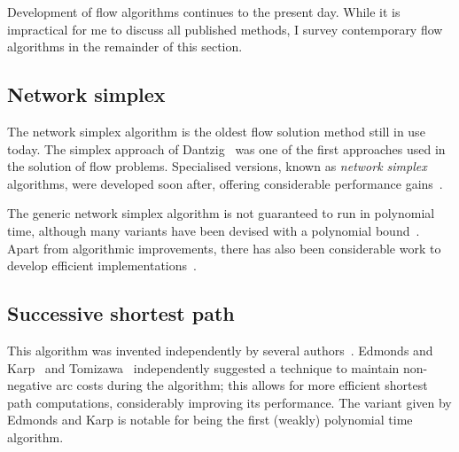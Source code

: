 
Development of flow algorithms continues to the present day. While it is impractical for me to discuss all published methods, I survey contemporary flow algorithms in the remainder of this section.

\subsection{Network simplex}

The network simplex algorithm is the oldest flow solution method still in use today. The simplex approach of Dantzig~\cite{Dantzig:1949} was one of the first approaches used in the solution of flow problems. Specialised versions, known as \emph{network simplex} algorithms, were developed soon after, offering considerable performance gains~\cite{Dantzig:1962}.

The generic network simplex algorithm is not guaranteed to run in polynomial time\footnotemark, although many variants have been devised with a polynomial bound~\cite{Tarjan:1991,Goldfarb:1992}. Apart from algorithmic improvements, there has also been considerable work to develop efficient implementations~\cite{Lobel:1996,Grigoriadis:1986}.

\subsection{Successive shortest path} \label{sec:intro-related-work-ssp}

This algorithm was invented independently by several authors~\cite{Jewell:1958,Iri:1960,BusackerGowen:1960}. Edmonds and Karp~\cite{Edmonds:1972} and Tomizawa~\cite{Tomizawa:1971} independently suggested a technique to maintain non-negative arc costs during the algorithm; this allows for more efficient shortest path computations, considerably improving its performance. The variant given by Edmonds and Karp is notable for being the first (weakly) polynomial time algorithm\footnotemark.

